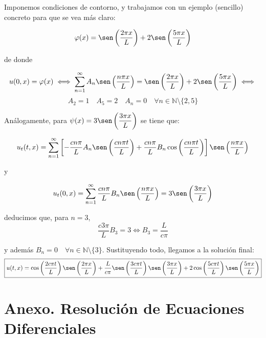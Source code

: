 \documentclass[12pt]{book}
\begin{document}
    Imponemos condiciones de contorno, y trabajamos con un ejemplo (sencillo) concreto para que se vea más claro:
    
    $$\varphi(x) = \sen \left(\dfrac{2 \pi x}{L} \right) + 2 \sen \left(\dfrac{5 \pi x}{L} \right)$$
    
    de donde
    
    $$u(0,x) = \varphi(x) \iff \sum_{n=1}^{\infty} A_n \sen \left( \dfrac{n \pi x}{L} \right) =  \sen \left(\dfrac{2 \pi x}{L} \right) + 2 \sen \left(\dfrac{5 \pi x}{L} \right) \iff$$$$ A_2 = 1 \quad A_5 = 2 \quad A_n = 0 \quad \forall n \in \mathbb{N} \setminus \{2,5\}$$

    Análogamente, para $\psi(x) = 3 \sen \left( \dfrac{3 \pi x}{L} \right)$ se tiene que:

    $$u_t(t,x) = \sum_{n=1}^{\infty} \left[- \dfrac{c n \pi}{L} A_n \sen \left( \dfrac{c n \pi t}{L} \right) + \dfrac{c n \pi}{L} B_n \cos \left( \dfrac{c n \pi t}{L} \right) \right] \sen \left( \dfrac{n \pi x}{L} \right)$$

    y 

    $$u_t(0,x) = \sum_{n=1}^{\infty} \dfrac{c n \pi}{L} B_n \sen \left( \dfrac{n \pi x}{L} \right) = 3 \sen \left( \dfrac{3 \pi x}{L} \right)$$

    deducimos que, para $n = 3$, $$\dfrac{c 3 \pi}{L} B_3 = 3 \iff B_3 = \dfrac{L}{c \pi}$$

    y además $B_n = 0 \quad \forall n \in \mathbb{N} \setminus \{3\}$. Sustituyendo todo, llegamos a la solución final:
    $$\boxed{u(t,x) = \cos \left( \dfrac{2 c \pi t}{L} \right) \sen \left( \dfrac{2 \pi x}{L} \right) + \dfrac{L}{c \pi} \sen \left( \dfrac{3 c \pi t}{L} \right) \sen \left( \dfrac{3 \pi x}{L} \right) + 2 \cos \left( \dfrac{5 c \pi t}{L} \right) \sen \left( \dfrac{5 \pi x}{L} \right)}$$

    \section*{Anexo. Resolución de Ecuaciones Diferenciales}
\end{document}
